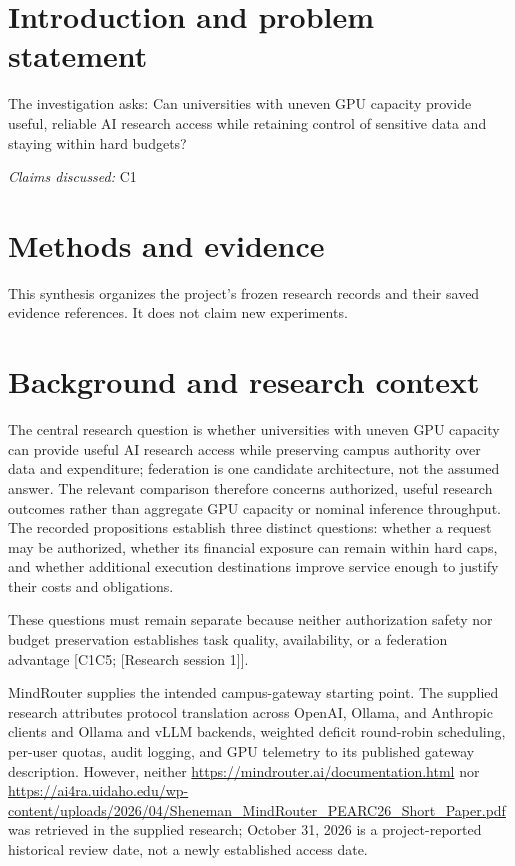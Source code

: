 \documentclass[11pt]{article}
\begin{document}
\section{Introduction and problem statement}
The investigation asks: Can universities with uneven GPU capacity provide useful, reliable AI research access while retaining control of sensitive data and staying within hard budgets?

\textit{Claims discussed: }C1
\section{Methods and evidence}
This synthesis organizes the project's frozen research records and their saved evidence references. It does not claim new experiments.

\section{Background and research context}
The central research question is whether universities with uneven GPU capacity can provide useful AI research access while preserving campus authority over data and expenditure; federation is one candidate architecture, not the assumed answer. The relevant comparison therefore concerns authorized, useful research outcomes rather than aggregate GPU capacity or nominal inference throughput. The recorded propositions establish three distinct questions: whether a request may be authorized, whether its financial exposure can remain within hard caps, and whether additional execution destinations improve service enough to justify their costs and obligations.

These questions must remain separate because neither authorization safety nor budget preservation establishes task quality, availability, or a federation advantage [C1\textendash{}C5; [Research session 1]].

MindRouter supplies the intended campus-gateway starting point. The supplied research attributes protocol translation across OpenAI, Ollama, and Anthropic clients and Ollama and vLLM backends, weighted deficit round-robin scheduling, per-user quotas, audit logging, and GPU telemetry to its published gateway description. However, neither \url{https://mindrouter.ai/documentation.html} nor \url{https://ai4ra.uidaho.edu/wp-content/uploads/2026/04/Sheneman_MindRouter_PEARC26_Short_Paper.pdf} was retrieved in the supplied research; October 31, 2026 is a project-reported historical review date, not a newly established access date.
\end{document}
